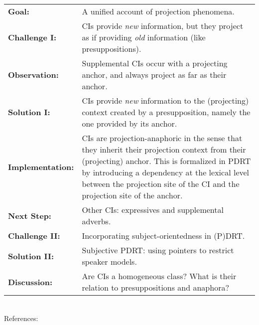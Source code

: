 \documentclass{salt}
\begin{document}
\bigskip
\noindent
\begin{tabular}{p{} p{}}
          \textbf{Goal:} & A unified account of projection phenomena.\\
   \textbf{Challenge I:} & CIs provide \textit{new} information, but they
                           project as if providing \textit{old} information
                           (like presuppositions).\\
   \textbf{Observation:} & Supplemental CIs occur with a projecting anchor,
                           and always project as far as their anchor.\\
    \textbf{Solution I:} & CIs provide \textit{new} information to the
                           (projecting) context created by a presupposition,
                           namely the one provided by its anchor.\\
\textbf{Implementation:} & CIs are projection-anaphoric in the sense that
                           they inherit their projection context from their
                           (projecting) anchor. This is formalized in PDRT
                           \citep{venhuizen2013iwcs} by introducing a
                           dependency at the lexical level between the
                           projection site of the CI and the projection site
                           of the anchor.\\
     \textbf{Next Step:} & Other CIs: expressives and supplemental adverbs.\\
  \textbf{Challenge II:} & Incorporating subject-orientedness in (P)DRT.\\
   \textbf{Solution II:} & Subjective PDRT: using pointers to restrict speaker
                           models.\\
    \textbf{Discussion:} & Are CIs a homogeneous class? What is their relation
                           to presuppositions and anaphora?\\
\end{tabular}\\

References: \citep{delgobbo2003appositives,potts2005logic,amaral2007review,
  nouwen2007appositives,harris2009perspective,heringa2012appositional,
  schlenker2013supplements,nouwen2014note,potts2013presupposition}
\end{document}
